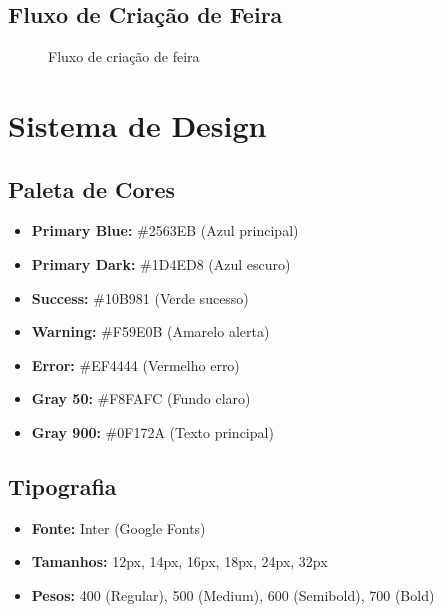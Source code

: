 \documentclass[12pt,a4paper]{article}
\begin{document}
\subsection{Fluxo de Criação de Feira}

\begin{figure}[H]
\centering
{}
\caption{Fluxo de criação de feira}
\label{fig:fluxo_criacao}
\end{figure}

\section{Sistema de Design}

\subsection{Paleta de Cores}

\begin{itemize}
    \item \textbf{Primary Blue:} \#2563EB (Azul principal)
    \item \textbf{Primary Dark:} \#1D4ED8 (Azul escuro)
    \item \textbf{Success:} \#10B981 (Verde sucesso)
    \item \textbf{Warning:} \#F59E0B (Amarelo alerta)
    \item \textbf{Error:} \#EF4444 (Vermelho erro)
    \item \textbf{Gray 50:} \#F8FAFC (Fundo claro)
    \item \textbf{Gray 900:} \#0F172A (Texto principal)
\end{itemize}

\subsection{Tipografia}

\begin{itemize}
    \item \textbf{Fonte:} Inter (Google Fonts)
    \item \textbf{Tamanhos:} 12px, 14px, 16px, 18px, 24px, 32px
    \item \textbf{Pesos:} 400 (Regular), 500 (Medium), 600 (Semibold), 700 (Bold)
\end{itemize}
\end{document}
